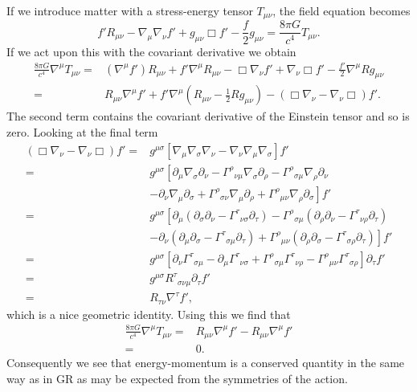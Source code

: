 \documentclass[a4paper, 11pt, titlepage, twoside]{report}
\newcommand{\recip}[1]{\ensuremath{\frac{1}{#1}}}
\begin{document}
If we introduce matter with a stress-energy tensor $T_{\mu\nu}$, the field equation becomes
\begin{equation}
f'R_{\mu\nu} - \nabla_\mu\nabla_\nu f' + g_{\mu\nu}\Box f' - \frac{f}{2}g_{\mu\nu} = \frac{8\pi G}{c^4}T_{\mu\nu}.
\end{equation}
If we act upon this with the covariant derivative we obtain
\begin{align}
\frac{8\pi G}{c^4}\nabla^\mu T_{\mu\nu} = {} & (\nabla^\mu f')R_{\mu\nu} + f'\nabla^\mu R_{\mu\nu} - \Box\nabla_\nu f' + \nabla_\nu\Box f' - \frac{f'}{2}\nabla^\mu R g_{\mu\nu} \nonumber \\
= {} & R_{\mu\nu}\nabla^\mu f' + f'\nabla^\mu\left(R_{\mu\nu} - \recip{2}R g_{\mu\nu}\right) - \left(\Box\nabla_\nu - \nabla_\nu\Box\right)f'.
\end{align}
The second term contains the covariant derivative of the Einstein tensor and so is zero. Looking at the final term
\begin{align}
\left(\Box\nabla_\nu - \nabla_\nu\Box\right)f' = {} & g^{\mu\sigma}\left[\nabla_\mu\nabla_\sigma\nabla_\nu - \nabla_\nu\nabla_\mu\nabla_\sigma\right]f' \nonumber \\
= {} & g^{\mu\sigma}\left[\partial_\mu\nabla_\sigma\partial_\nu - {\Gamma^\rho}_{\nu\mu}\nabla_\sigma\partial_\rho - {\Gamma^\rho}_{\sigma\mu}\nabla_\rho\partial_\nu\right. \nonumber \\
 & \left. - \partial_\nu\nabla_\mu\partial_\sigma + {\Gamma^\rho}_{\sigma\nu}\nabla_\mu\partial_\rho + {\Gamma^\rho}_{\mu\nu}\nabla_\rho\partial_\sigma\right]f' \nonumber \\
= {} & g^{\mu\sigma}\left[\partial_\mu\left(\partial_\sigma\partial_\nu - {\Gamma^\tau}_{\nu\sigma}\partial_\tau\right) - {\Gamma^\rho}_{\sigma\mu}\left(\partial_\rho\partial_\nu - {\Gamma^\tau}_{\nu\rho}\partial_\tau\right)\right. \nonumber \\
 & \left. - \partial_\nu\left(\partial_\mu\partial_\sigma - {\Gamma^\tau}_{\sigma\mu}\partial_\tau\right) + {\Gamma^\rho}_{\mu\nu}\left(\partial_\rho\partial_\sigma - {\Gamma^\tau}_{\sigma\rho}\partial_\tau\right)\right]f' \nonumber \\
= {} & g^{\mu\sigma}\left[\partial_\nu{\Gamma^\tau}_{\sigma\mu} -\partial_\mu{\Gamma^\tau}_{\nu\sigma} + {\Gamma^\rho}_{\sigma\mu} {\Gamma^\tau}_{\nu\rho} - {\Gamma^\rho}_{\mu\nu}{\Gamma^\tau}_{\sigma\rho}\right]\partial_\tau f' \nonumber \\
= {} & g^{\mu\sigma}{R^\tau}_{\sigma\nu\mu}\partial_\tau f' \nonumber \\
= {} & R_{\tau\nu}\nabla^\tau f',
\end{align}
which is a nice geometric identity. Using this we find that
\begin{align}
\frac{8\pi G}{c^4}\nabla^\mu T_{\mu\nu} = {} & R_{\mu\nu}\nabla^\mu f' - R_{\mu\nu}\nabla^\mu f' \nonumber \\
 = {} & 0.
\end{align}
Consequently we see that energy-momentum is a conserved quantity in the same way as in GR as may be expected from the symmetries of the action.
\end{document}
